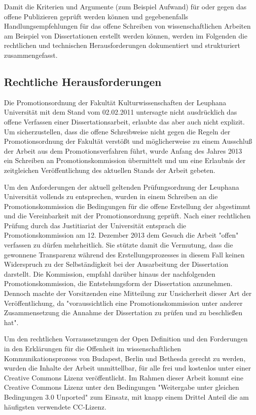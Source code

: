 Damit die Kriterien und Argumente (zum Beispiel Aufwand) für oder gegen das offene Publizieren geprüft werden können und gegebenenfalls Handlungsempfehlungen für das offene Schreiben von wissenschaftlichen Arbeiten am Beispiel von Dissertationen erstellt werden können, werden im Folgenden die rechtlichen und technischen Herausforderungen dokumentiert und strukturiert zusammengefasst.

\subsection{Rechtliche Herausforderungen}

Die Promotionsordnung der Fakultät Kulturwissenschaften der Leuphana Universität mit dem Stand vom 02.02.2011 \cite{promotionsordnung_leuphana_kuwi_2011} untersagte nicht ausdrücklich das offene Verfassen einer Dissertationsarbeit, erlaubte das aber auch nicht explizit. Um sicherzustellen, dass die offene Schreibweise nicht gegen die Regeln der Promotionsordnung der Fakultät verstößt und möglicherweise zu einem Ausschluß der Arbeit aus dem Promotionsverfahren führt, wurde Anfang des Jahres 2013 ein Schreiben an Promotionskommission übermittelt und um eine Erlaubnis der zeitgleichen Veröffentlichung des aktuellen Stands der Arbeit gebeten.

Um den Anforderungen der aktuell geltenden Prüfungsordnung der Leuphana Universität vollends zu entsprechen, wurden in einem Schreiben an die Promotionskommission die Bedingungen für die offene Erstellung der abgestimmt und die Vereinbarkeit mit der Promotionsordnung geprüft. Nach einer rechtlichen Prüfung durch das Justitiariat der Universität entsprach die Promotionskommission am 12. Dezember 2013 dem Gesuch die Arbeit "offen" verfassen zu dürfen mehrheitlich. Sie stützte damit die Vermutung, dass die gewonnene Transparenz während des Erstellungsprozesses in diesem Fall keinen Widerspruch zu der Selbständigkeit bei der Ausarbeitung der Dissertation darstellt. Die Kommission, empfahl darüber hinaus der nachfolgenden Promotionskommission, die Entstehungsform der Dissertation anzunehmen. Dennoch machte der Vorsitzenden eine Mitteilung zur Unsicherheit dieser Art der Veröffentlichung, da "voraussichtlich eine Promotionskommission unter anderer Zusammensetzung die Annahme der Dissertation zu prüfen und zu beschließen hat".

Um den rechtlichen Vorraussetzungen der Open Definition und den Forderungen in den Erklärungen für die Offenheit im wissenschaftlichen Kommunikationsprozess von Budapest, Berlin und Bethesda gerecht zu werden, wurden die Inhalte der Arbeit unmittellbar, für alle frei und kostenlos unter einer Creative Commons Lizenz veröffentlicht. Im Rahmen dieser Arbeit kommt eine Creative Commons Lizenz unter den Bedingungen "Weitergabe unter gleichen Bedingungen 3.0 Unported" zum Einsatz, mit knapp einem Drittel Anteil die am häufigsten verwendete CC-Lizenz.

